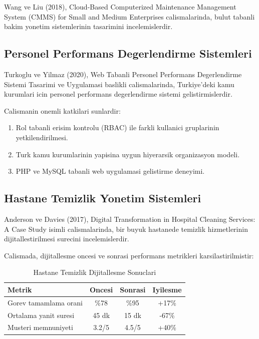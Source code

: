 Wang ve Liu (2018), Cloud-Based Computerized Maintenance Management 
System (CMMS) for Small and Medium Enterprises calismalarinda, bulut 
tabanli bakim yonetim sistemlerinin tasarimini incelemislerdir.

\subsection{Personel Performans Degerlendirme Sistemleri}
\label{subsec:performans-degerlendirme}

Turkoglu ve Yilmaz (2020), Web Tabanli Personel Performans 
Degerlendirme Sistemi Tasarimi ve Uygulamasi baslikli calismalarinda, 
Turkiye'deki kamu kurumlari icin personel performans degerlendirme 
sistemi gelistirmislerdir.

Calismanin onemli katkilari sunlardir:
\begin{enumerate}
    \item Rol tabanli erisim kontrolu (RBAC) ile farkli kullanici 
    gruplarinin yetkilendirilmesi.
    \item Turk kamu kurumlarinin yapisina uygun hiyerarsik 
    organizasyon modeli.
    \item PHP ve MySQL tabanli web uygulamasi gelistirme deneyimi.
\end{enumerate}

\subsection{Hastane Temizlik Yonetim Sistemleri}
\label{subsec:hastane-temizlik}

Anderson ve Davies (2017), Digital Transformation in Hospital Cleaning 
Services: A Case Study isimli calismalarinda, bir buyuk hastanede 
temizlik hizmetlerinin dijitallestirilmesi surecini incelemislerdir.

Calismada, dijitallesme oncesi ve sonrasi performans metrikleri 
karsilastirilmistir:

\begin{table}[H]
\centering
\caption{Hastane Temizlik Dijitallesme Sonuclari}
\label{tab:hastane-dijitallesme}
\begin{tabular}{|l|c|c|c|}
\hline
\textbf{Metrik} & \textbf{Oncesi} & \textbf{Sonrasi} & \textbf{Iyilesme} \\
\hline
Gorev tamamlama orani & \%78 & \%95 & +17\% \\
\hline
Ortalama yanit suresi & 45 dk & 15 dk & -67\% \\
\hline
Musteri memnuniyeti & 3.2/5 & 4.5/5 & +40\% \\
\hline
\end{tabular}
\end{table}

